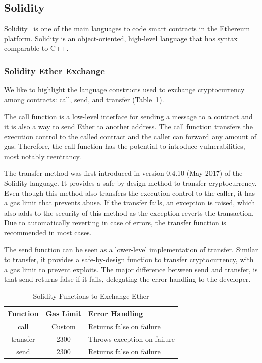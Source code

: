 \documentclass[10pt,conference]{IEEEtran}
\begin{document}
\subsection{Solidity}

Solidity~\cite{solidity} is one of the main languages to code smart contracts in the Ethereum platform. Solidity is an object-oriented, high-level language that has syntax comparable to C++.

\subsubsection{Solidity Ether Exchange}

We like to highlight the language constructs used to exchange cryptocurrency among contracts: call, send, and transfer (Table~\ref{tab:freq}).

The call function is a low-level interface for sending a message to a contract and it is also a way to send Ether to another address. The call function transfers the execution control to the called contract and the caller can forward any amount of gas. Therefore, the call function has the potential to introduce vulnerabilities, most notably reentrancy.

The transfer method was first introduced in version 0.4.10 (May 2017) of the Solidity language. It provides a safe-by-design method to transfer cryptocurrency. Even though this method also transfers the execution control to the caller, it has a gas limit that prevents abuse. If the transfer fails, an exception is raised, which also adds to the security of this method as the exception reverts the transaction. Due to automatically reverting in case of errors, the transfer function is recommended in most cases.

The send function can be seen as a lower-level implementation of transfer. Similar to transfer, it provides a safe-by-design function to transfer cryptocurrency, with a gas limit to prevent exploits. The major difference between send and transfer, is that send returns false if it fails, delegating the error handling to the developer.


\begin{table}
\center
  \caption{Solidity Functions to Exchange Ether}
  \label{tab:freq}
  \begin{tabular}{ccl}
    \hline
    Function & Gas Limit & Error Handling\\
    \hline
    call & Custom & Returns false on failure\\
    transfer & 2300 & Throws exception on failure\\
    send & 2300 & Returns false on failure\\
  \hline
\end{tabular}
\end{table}
\end{document}
